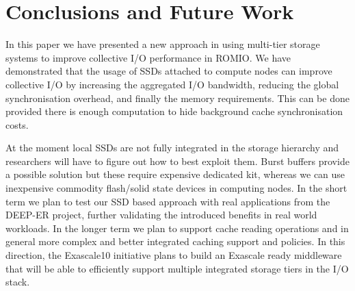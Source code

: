 \section{Conclusions and Future Work}
\label{sec: conclusion}

In this paper we have presented a new approach in using multi-tier storage systems to improve collective I/O performance in ROMIO. We have demonstrated that the usage of SSDs attached to compute nodes can improve collective I/O by increasing the aggregated I/O bandwidth, reducing the global synchronisation overhead, and finally the memory requirements. This can be done provided there is enough computation to hide background cache synchronisation costs.

At the moment local SSDs are not fully integrated in the storage hierarchy and researchers will have to figure out how to best exploit them. Burst buffers provide a possible solution but these require expensive dedicated kit, whereas we can use inexpensive commodity flash/solid state devices in computing nodes. In the short term we plan to test our SSD based approach with real applications from the DEEP-ER project, further validating the introduced benefits in real world workloads. In the longer term we plan to support cache reading operations and in general more complex and better integrated caching support and policies. In this direction, the Exascale10 initiative plans to build an Exascale ready middleware that will be able to efficiently support multiple integrated storage tiers in the I/O stack.
